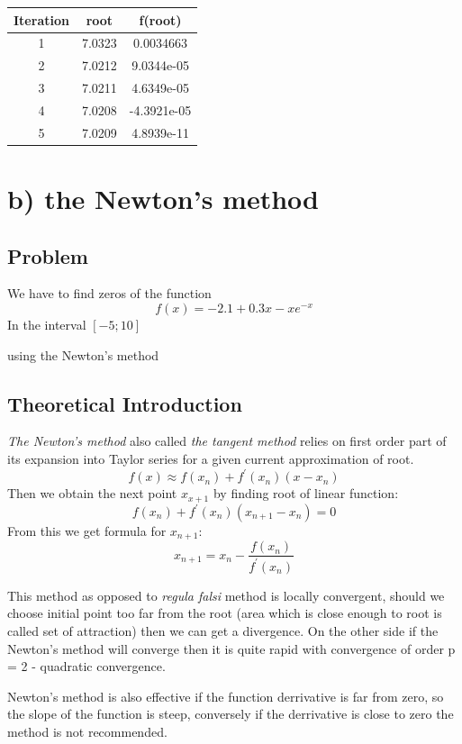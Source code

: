 \documentclass[12pt]{report}
\begin{document}
\begin{center}
  \begin{tabular}{| c  c c |}
\hline
Iteration & root         & f(root) \\
\hline
1   &  7.0323         & 0.0034663 \\
\hline
2   &  7.0212          & 9.0344e-05 \\
\hline
3    & 7.0211         & 4.6349e-05 \\
\hline
4     & 7.0208        & -4.3921e-05  \\
\hline
5     & 7.0209        & 4.8939e-11  \\
\hline

\hline
\end{tabular}
\end{center}

\section{b) the Newton's method}


\subsection{Problem}

We have to find zeros of the function
\[ f(x) = -2.1 + 0.3x - xe^{-x} \]
In the interval $[-5; 10]$

using the Newton's method
\subsection{Theoretical Introduction}
\emph{The Newton's method} also called \emph{the tangent method} relies on first order part of its expansion into Taylor series for a given current approximation of root.
\[ f(x) \approx f(x_n) + f^{'}(x_n)(x-x_n) \]
Then we obtain the next point $x_{x+1}$ by finding root of linear function:
\[ f(x_n) + f^{'}(x_n)(x_{n+1}-x_n) = 0 \]
From this we get formula for $x_{n+1}$:
\[ x_{n+1} = x_n - \frac{f(x_n)}{f^{'}(x_n)} \]

This method as opposed to \emph{regula falsi} method is locally convergent, should we choose initial point too far from the root (area which is close enough to root is called set of attraction) then we can get a divergence. On the other side if the Newton's method will converge then it is quite rapid with convergence of order p = 2 - quadratic convergence.

Newton's method is also effective if the function derrivative is far from zero, so the slope of the function is steep, conversely if the derrivative is close to zero the method is not recommended.
\end{document}

